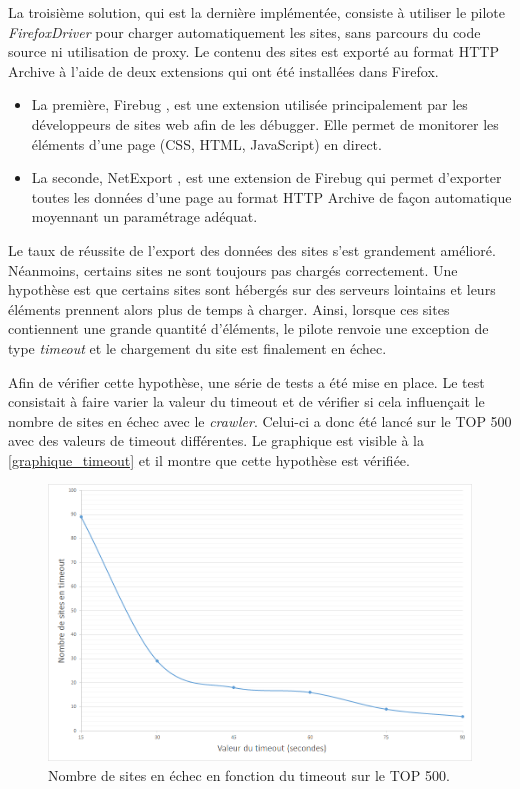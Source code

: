 La troisième solution, qui est la dernière implémentée, consiste à utiliser le pilote \textit{FirefoxDriver} pour charger automatiquement les sites, sans parcours du code source ni utilisation de proxy. Le contenu des sites est exporté au format HTTP Archive à l'aide de deux extensions qui ont été installées dans Firefox.
\begin{itemize}
	\item La première, Firebug \cite{firebug_homepage}, est une extension utilisée principalement par les développeurs de sites web afin de les débugger. Elle permet de monitorer les éléments d'une page (CSS, HTML, JavaScript) en direct.
	\item La seconde, NetExport \cite{netexport_homepage}, est une extension de Firebug qui permet d'exporter toutes les données d'une page au format HTTP Archive de façon automatique moyennant un paramétrage adéquat.
\end{itemize}

Le taux de réussite de l'export des données des sites s'est grandement amélioré. Néanmoins, certains sites ne sont toujours pas chargés correctement.
Une hypothèse est que certains sites sont hébergés sur des serveurs lointains et leurs éléments prennent alors plus de temps à charger. Ainsi, lorsque ces sites contiennent une grande quantité d'éléments, le pilote renvoie une exception de type \textit{timeout} et le chargement du site est finalement en échec.

Afin de vérifier cette hypothèse, une série de tests a été mise en place. Le test consistait à faire varier la valeur du timeout et de vérifier si cela influençait le nombre de sites en échec avec le \textit{crawler}. Celui-ci a donc été lancé sur le TOP 500 avec des valeurs de timeout différentes.
Le graphique est visible à la \autoref{graphique_timeout} et il montre que cette hypothèse est vérifiée.
\newline

\begin{figure}[!h]
	\centering
	\includegraphics[scale=.6]{timeouts/Timeouts.png}
	\caption{\label{graphique_timeout}Nombre de sites en échec en fonction du timeout sur le TOP 500.}
\end{figure}

